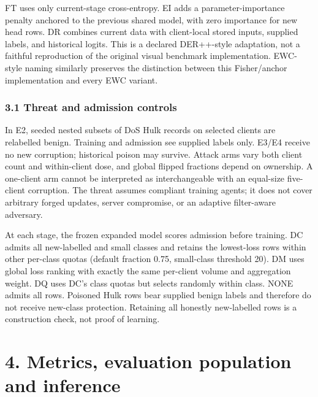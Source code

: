 \documentclass[
  10pt,
]{article}
\begin{document}
FT uses only current-stage cross-entropy. EI adds a parameter-importance
penalty anchored to the previous shared model, with zero importance for
new head rows. DR combines current data with client-local stored inputs,
supplied labels, and historical logits. This is a declared DER++-style
adaptation, not a faithful reproduction of the original visual benchmark
implementation. EWC-style naming similarly preserves the distinction
between this Fisher/anchor implementation and every EWC variant.

\hypertarget{threat-and-admission-controls}{%
\subsubsection{3.1 Threat and admission
controls}\label{threat-and-admission-controls}}

In E2, seeded nested subsets of DoS Hulk records on selected clients are
relabelled benign. Training and admission see supplied labels only.
E3/E4 receive no new corruption; historical poison may survive. Attack
arms vary both client count and within-client dose, and global flipped
fractions depend on ownership. A one-client arm cannot be interpreted as
interchangeable with an equal-size five-client corruption. The threat
assumes compliant training agents; it does not cover arbitrary forged
updates, server compromise, or an adaptive filter-aware adversary.

At each stage, the frozen expanded model scores admission before
training. DC admits all new-labelled and small classes and retains the
lowest-loss rows within other per-class quotas (default fraction 0.75,
small-class threshold 20). DM uses global loss ranking with exactly the
same per-client volume and aggregation weight. DQ uses DC's class quotas
but selects randomly within class. NONE admits all rows. Poisoned Hulk
rows bear supplied benign labels and therefore do not receive new-class
protection. Retaining all honestly new-labelled rows is a construction
check, not proof of learning.

\hypertarget{metrics-evaluation-population-and-inference}{%
\section{4. Metrics, evaluation population and
inference}\label{metrics-evaluation-population-and-inference}}
\end{document}
